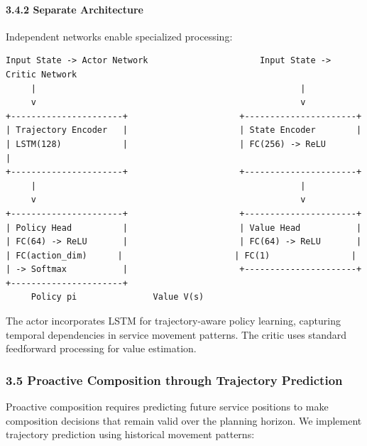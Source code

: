 \hypertarget{separate-architecture}{%
	\paragraph{3.4.2 Separate Architecture}\label{separate-architecture}}

Independent networks enable specialized processing:

\begin{verbatim}
Input State -> Actor Network                      Input State -> Critic Network
     |                                                    |
     v                                                    v
+----------------------+                      +----------------------+
| Trajectory Encoder   |                      | State Encoder        |
| LSTM(128)            |                      | FC(256) -> ReLU       |
+----------------------+                      +----------------------+
     |                                                    |
     v                                                    v
+----------------------+                      +----------------------+
| Policy Head          |                      | Value Head           |
| FC(64) -> ReLU       |                      | FC(64) -> ReLU       |
| FC(action_dim)      |                      | FC(1)                |
| -> Softmax           |                      +----------------------+
+----------------------+
     Policy pi               Value V(s)
\end{verbatim}

The actor incorporates LSTM for trajectory-aware policy learning,
capturing temporal dependencies in service movement patterns. The critic
uses standard feedforward processing for value estimation.

\hypertarget{proactive-composition-through-trajectory-prediction}{%
	\subsubsection{3.5 Proactive Composition through Trajectory
		Prediction}\label{proactive-composition-through-trajectory-prediction}}

Proactive composition requires predicting future service positions to
make composition decisions that remain valid over the planning horizon.
We implement trajectory prediction using historical movement patterns:


